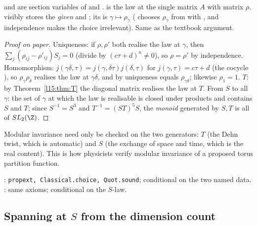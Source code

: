 \begin{dictionary}
 and  are section variables of
 and \allowbreak{}.  is the law at the single matrix
$A$ with matrix $\rho$.  visibly stores the \emph{given}  and ; its  is
$\gamma\mapsto\rho_\gamma$ ( chooses $\rho_\gamma$ from  with , and independence
makes the choice irrelevant). Same as the textbook argument.
\end{dictionary}

\begin{proof}[Proof on paper]
Uniqueness: if $\rho,\rho'$ both realise the law at $\gamma$, then $\sum_j(\rho_{ij}-\rho'_{ij})S_j=0$ (divide by $(c\tau+d)^n\ne0$),
so $\rho=\rho'$ by independence. Homomorphism: $j(\gamma\delta,\tau)=j(\gamma,\delta\tau)j(\delta,\tau)$ for
$j(\gamma,\tau)=c\tau+d$ (the cocycle ), so $\rho_\gamma\rho_\delta$ realises the law at $\gamma\delta$, and
by uniqueness equals $\rho_{\gamma\delta}$; likewise $\rho_1=1$. $T$: by Theorem~\ref{l15:thm:T} the diagonal matrix realises
the law at $T$. From $S$ to all $\gamma$: the set of $\gamma$ at which the law is realisable is closed under products and contains
$S$ and $T$; since $S^{-1}=S^3$ and $T^{-1}=(ST)^5S$, the \emph{monoid} generated by $S,T$ is all of $\lfifteenSL$.
\end{proof}

\begin{physics}
Modular invariance need only be checked on the two generators: $T$ (the Dehn twist, which is automatic) and $S$ (the
exchange of space and time, which is the real content). This is how physicists verify modular invariance of a proposed
torus partition function.
\end{physics}

\begin{status}
\allowbreak{}\allowbreak{}: \texttt{propext, Classical.choice, Quot.sound}; conditional on the two named data.
: same axioms; conditional on the $S$-law.
\end{status}

\subsection{Spanning at \texorpdfstring{$S$}{S} from the dimension count}


